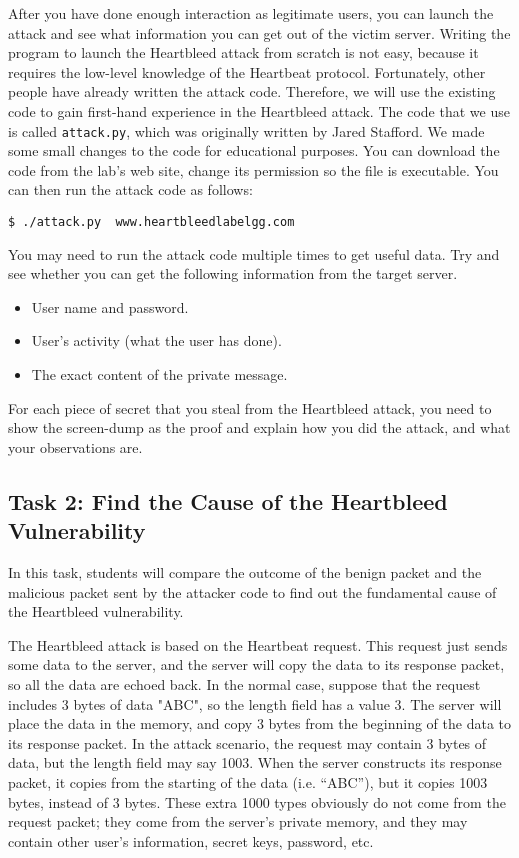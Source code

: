 After you have done enough interaction as legitimate users, you can launch
the attack and see what information you can get out of the victim server. 
Writing the program to launch the Heartbleed attack from scratch is not
easy, because it requires the low-level knowledge of the Heartbeat
protocol. Fortunately, other people have already written the
attack code. Therefore, we will use the existing code to gain
first-hand experience in the Heartbleed attack.
The code that we use is called \texttt{attack.py},
which was originally written by Jared Stafford.
We made some small changes to the code for educational purposes.
You can download the code from the lab's web site, change its permission so
the file is executable. You can then run the attack code as follows:

\begin{lstlisting}
$ ./attack.py  www.heartbleedlabelgg.com
\end{lstlisting}
	   
You may need to run the attack code multiple times to get useful data. 
Try and see whether you can get the following information from the target
server. 

\begin{itemize} 
	\item User name and password.
	\item User's activity (what the user has done).
	\item The exact content of the private message.
\end{itemize} 
  
For each piece of secret that you steal from the Heartbleed attack, you need to
show the screen-dump as the proof and explain how you did the attack, 
and what your observations are.



\subsection{Task 2: Find the Cause of the Heartbleed Vulnerability}

In this task, students will compare the outcome of the benign packet and
the malicious packet sent by the attacker code to find out the fundamental
cause of the Heartbleed vulnerability. 


The Heartbleed attack is based on the Heartbeat request. This request just
sends some data to the server, and the server will copy the data to its
response packet, so all
the data are echoed back.
In the normal case, suppose that the request includes 3 bytes of data "ABC",
so the length field has a value 3. The server will place the 
data in the memory, and copy 3 bytes from the beginning of the data to its
response packet. 
In the attack scenario, the request may contain 3 bytes of data, but 
the length field may say 1003. When the server constructs its response packet, it copies from the
starting of the data (i.e. ``ABC''), but it copies 1003 bytes, instead of 3 bytes. 
These extra 1000 types obviously do not come from the request packet; they come from the 
server's private memory, and they may contain other user's
information, secret keys, password, etc. 


